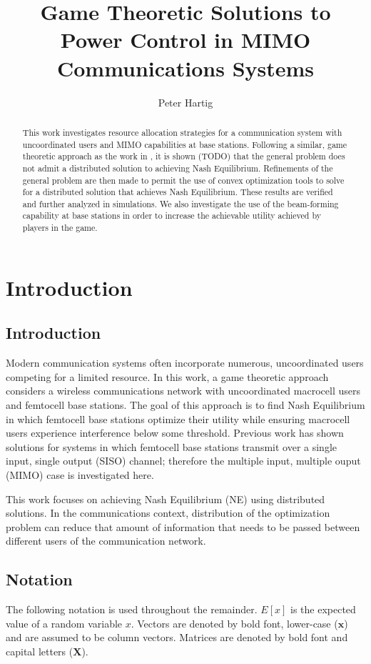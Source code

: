 \documentclass[12pt,a4paper]{report}
\title{Game Theoretic Solutions to Power Control in MIMO Communications Systems}
\author{Peter Hartig}
\begin{document}
\maketitle
\begin{abstract}
This work investigates resource allocation strategies for a communication system with uncoordinated users and MIMO capabilities at base stations. Following a similar, game theoretic approach as the work in \cite{ghosh2015normalized}, it is shown (TODO) that the general problem does not admit a distributed solution to achieving Nash Equilibrium. Refinements of the general problem are then made to permit the use of convex optimization tools to solve for a distributed solution that achieves Nash Equilibrium. These results are verified and further analyzed in simulations. We also investigate the use of the beam-forming capability at base stations in order to increase the achievable utility achieved by players in the game. 
\end{abstract}
%
\tableofcontents


\chapter{Introduction}
\section{Introduction}
Modern communication systems often incorporate numerous, uncoordinated users competing for a limited resource.
In this work, a game theoretic approach considers a wireless communications network with uncoordinated  macrocell users and femtocell base stations. The goal of this approach is to find Nash Equilibrium in which femtocell base stations optimize their utility while ensuring macrocell users experience interference below some threshold. 
Previous work has shown solutions for systems in which femtocell base stations transmit over a single input, single output (SISO) channel; therefore the multiple input, multiple ouput (MIMO) case is investigated here. 
\par
This work focuses on achieving Nash Equilibrium (NE) using distributed solutions. In the communications context, distribution of the optimization problem can reduce that amount of information that needs to be passed between different users of the communication network. 


\section{Notation}
The following notation is used throughout the remainder. 
$E[x]$ is the expected value of a random variable $x$.
Vectors are denoted by bold font, lower-case ($\mathbf{x}$) and are assumed to be column vectors.
Matrices are denoted by bold font and capital letters ($\mathbf{X}$).
\end{document}
